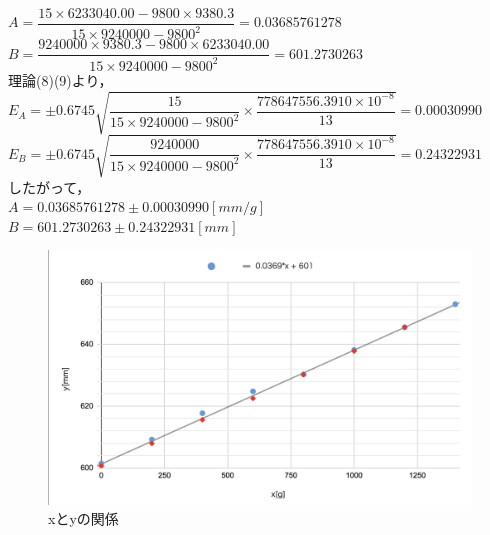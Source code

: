 \documentclass[a4paper,1pt]{jsarticle}
\begin{document}
$A=\dfrac{15\times6233040.00-9800\times9380.3}{15\times9240000-9800^2}=0.03685761278$\\

$B=\dfrac{9240000\times9380.3-9800\times6233040.00}{15\times9240000-9800^2}=601.2730263$\\

理論(8)(9)より，\\

$E_A=\pm0.6745\sqrt{\dfrac{15}{15\times9240000-9800^2}\times\dfrac{778647556.3910\times10^{-8}}{13}}=0.00030990$\\

$E_B=\pm0.6745\sqrt{\dfrac{9240000}{15\times9240000-9800^2}\times\dfrac{778647556.3910\times10^{-8}}{13}}=0.24322931$\\

したがって，\\

$A=0.03685761278\pm0.00030990[mm/g]$\\

$B=601.2730263\pm0.24322931[mm]$\\

\begin{figure}[h]
  \begin{center}
  \includegraphics[width=150mm]{actD.png}
  \caption{xとyの関係}
  \end{center}
\end{figure}



\clearpage
\end{document}
